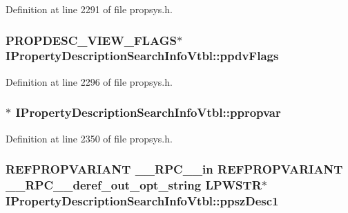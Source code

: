 Definition at line 2291 of file propsys.\+h.

\subsubsection[{\texorpdfstring{ppdv\+Flags}{ppdvFlags}}]{ {\bf P\+R\+O\+P\+D\+E\+S\+C\+\_\+\+V\+I\+E\+W\+\_\+\+F\+L\+A\+GS}$\ast$ I\+Property\+Description\+Search\+Info\+Vtbl\+::ppdv\+Flags}\hypertarget{struct_i_property_description_search_info_vtbl_a937d71d18ed602fba29167a3c9cb0aa2}{}\label{struct_i_property_description_search_info_vtbl_a937d71d18ed602fba29167a3c9cb0aa2}


Definition at line 2296 of file propsys.\+h.

\subsubsection[{\texorpdfstring{ppropvar}{ppropvar}}]{$\ast$ I\+Property\+Description\+Search\+Info\+Vtbl\+::ppropvar}\hypertarget{struct_i_property_description_search_info_vtbl_a5b4e61541621e71e520add1f26227374}{}\label{struct_i_property_description_search_info_vtbl_a5b4e61541621e71e520add1f26227374}


Definition at line 2350 of file propsys.\+h.

\subsubsection[{\texorpdfstring{ppsz\+Desc1}{ppszDesc1}}]{ {\bf R\+E\+F\+P\+R\+O\+P\+V\+A\+R\+I\+A\+NT} {\bf \+\_\+\+\_\+\+R\+P\+C\+\_\+\+\_\+in} {\bf R\+E\+F\+P\+R\+O\+P\+V\+A\+R\+I\+A\+NT} {\bf \+\_\+\+\_\+\+R\+P\+C\+\_\+\+\_\+deref\+\_\+out\+\_\+opt\+\_\+string} {\bf L\+P\+W\+S\+TR}$\ast$ I\+Property\+Description\+Search\+Info\+Vtbl\+::ppsz\+Desc1}\hypertarget{struct_i_property_description_search_info_vtbl_aa4792a105af86287448060b5b329f850}{}\label{struct_i_property_description_search_info_vtbl_aa4792a105af86287448060b5b329f850}


